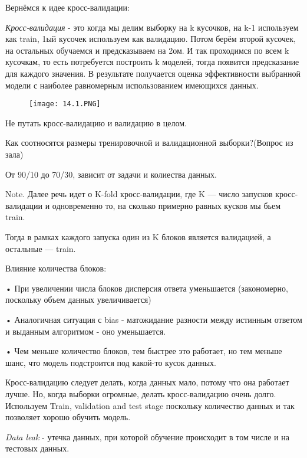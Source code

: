 Вернёмся к идее кросс-валидации:

\textit{Кросс-валидация} - это когда мы делим выборку на k кусочков, на k-1 используем как train, 1ый кусочек используем как валидацию. Потом берём второй кусочек, на остальных обучаемся и предсказываем на 2ом. И так проходимся по всем k кусочкам, то есть потребуется построить k моделей, тогда появится предсказание для каждого значения. В результате получается оценка эффективности выбранной модели с наиболее равномерным использованием имеющихся данных.

\begin{figure}[h]
\centering
\texttt{[image: 14.1.PNG]}
\caption{}
\end{figure}

Не путать кросс-валидацию и валидацию в целом.

Как соотносятся размеры тренировочной и валидационной выборки?(Вопрос из зала)

От 90/10 до 70/30, зависит от задачи и колиества данных. 

Note. Далее речь идет о K-fold кросс-валидации, где K — число запусков кросс-валидации и одновременно то, на сколько примерно равных кусков мы бьем train. 

Тогда в рамках каждого запуска один из K блоков является валидацией, а остальные — train.

Влияние количества блоков:

• При увеличении числа блоков дисперсия ответа уменьшается (закономерно, поскольку объем данных
увеличивается)

• Аналогичная ситуация с bias - матожидание разности между истинным ответом и выданным
алгоритмом - оно уменьшается.

• Чем меньше количество блоков, тем быстрее это работает, но тем меньше шанс, что модель
подстроится под какой-то кусок данных.

Кросс-валидацию следует делать, когда данных мало, потому что она работает лучше. Но, когда выборки огромные, делать кросс-валидацию очень долго. Используем Train, validation and test stage поскольку количество данных и так позволяет хорошо обучить модель.

\textit{Data leak} - утечка данных, при которой обучение происходит в том числе и на тестовых данных.
